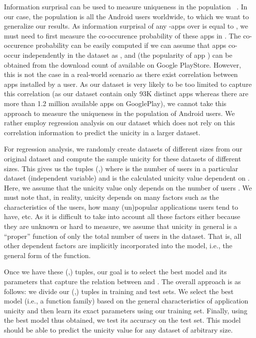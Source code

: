 \documentclass{acm_proc_article-sp}
\theoremstyle{plain}
\theoremstyle{plain}
\theoremstyle{plain}
\theoremstyle{plain}
\theoremstyle{plain}
\theoremstyle{plain}
\begin{document}
Information surprisal can be used to measure uniqueness in the population ~\cite{Eckersley10}.
In our case, the population is all the Android users worldwide, to which we want to generalize our results.
As information surprisal of any -apps  over  is equal to , we must need to first measure the co-occurence probability  of these apps in .
The co-occurence probability can be easily computed if we can assume that apps co-occur independently in the dataset as , and  (the popularity of app ) can be obtained from the download count of  available on Google PlayStore.
However, this is not the case in a real-world scenario as there exist correlation between apps installed by a user.
As our dataset is very likely to be too limited to capture this correlation (as our dataset contain only 93K distinct apps whereas there are more than 1.2 million available apps on GooglePlay), we cannot take this approach to measure the uniqueness in the population of Android users.
We rather employ regression analysis on our dataset which does not rely on this correlation information to predict the unicity in a larger dataset. 


For regression analysis, we randomly create datasets of different sizes from our original dataset and compute the sample unicity for these datasets of different sizes.
This gives us the tuples (,) where  is the number of users in a particular dataset (independent variable) and  is the calculated unicity value dependent on . 
Here, we assume that the unicity value  only depends on the number of users .  
We must note that, in reality, unicity depends on many factors such 
as the characteristics of the users, how many (un)popular applications users tend to have, etc.
As it is difficult to take into account all these factors either because they are unknown or hard to measure, we assume that unicity in general is a ``proper'' function of only the total number of users in the dataset. That is, all other dependent factors are implicitly incorporated into the model, i.e., the general form of the function.



Once we have these (,) tuples, our goal is to select the best model and its parameters that capture the relation between  and .
The overall approach is as follows: 
we divide our (,) tuples in training and test sets. 
We select the best model (i.e., a function family) based on the general characteristics of application unicity and then learn its exact parameters using our training set.
Finally, using the best model thus obtained, we test its accuracy on the test set.
This model should be able to predict the unicity value for any dataset of arbitrary size.
\end{document}
